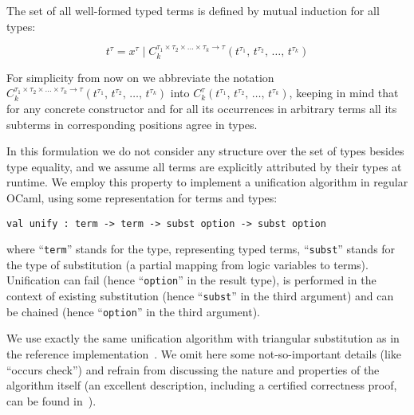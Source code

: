 The set of all well-formed typed terms is defined by mutual induction for all types:

$$
t^\tau=x^\tau\mid C_k^{\tau_1\times\tau_2\times\dots\times\tau_k\to\tau}(t^{\tau_1},\,t^{\tau_2},\,\dots,\,t^{\tau_k})
$$

For simplicity from now on we abbreviate the notation $C_k^{\tau_1\times\tau_2\times\dots\times\tau_k\to\tau}(t^{\tau_1},\,t^{\tau_2},\,\dots,\,t^{\tau_k})$ into
$C_k^\tau(t^{\tau_1},\,t^{\tau_2},\,\dots,\,t^{\tau_k})$, keeping in mind that for any concrete constructor and for all its occurrences
in arbitrary terms all its subterms in corresponding positions agree in types.

\begin{comment}
We need also to define the notion of a subterm  $t^\tau[p]$ of a term $t^\tau$ at given position $p$:

$$
\begin{array}{rcl}
 p=\epsilon\mid\{1, 2, 3,\dots\}\bullet p&-&\mbox{the set of positions}\\
 t^\tau[\epsilon]=t^\tau&-&\mbox{base case}\\
 C_k^\tau(t_1^{\tau_1},\,t_2^{\tau_2},\dots,\,t_k^{\tau_k})[i\bullet p]=t_i^{\tau_i}[p], 1\le i \le k&-&\mbox{inductive case}
\end{array}
$$
\end{comment}

In this formulation we do not consider any structure over the set of types besides type equality, and we assume all terms are explicitly
attributed by their types at runtime. We employ this property to implement a unification algorithm in regular OCaml, using some
representation for terms and types:

\begin{lstlisting}[mathescape=true]
    val unify : term -> term -> subst option -> subst option
\end{lstlisting}

\noindent where ``\lstinline{term}'' stands for the type, representing typed terms, ``\lstinline{subst}'' stands for the type of
substitution (a partial mapping from logic variables to terms). Unification can fail (hence ``\lstinline{option}'' in the result type),
is performed in the context of existing substitution (hence ``\lstinline{subst}'' in the third argument) and can be
chained (hence ``\lstinline{option}'' in the third argument).

We use exactly the same unification algorithm with triangular substitution as in the reference implementation~\cite{MicroKanren}. We
omit here some not-so-important details (like ``occurs check'') and refrain from discussing the nature and properties of the algorithm
itself (an excellent description, including a certified correctness proof, can be found in~\cite{Kumar}).

